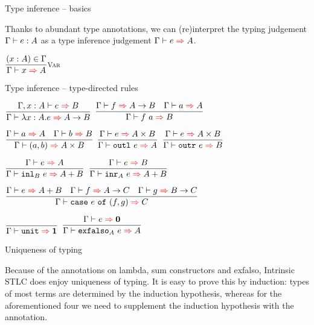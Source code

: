\documentclass{beamer}
\begin{document}
\begin{frame}{Type inference -- basics}

Thanks to abundant type annotations, we can (re)interpret the typing judgement $\Gamma \vdash e : A$ as a type inference judgement $\fullinfer{\Gamma}{e}{A}$.

\vspace{2em}

\begin{center}
  $\infrule[Var]{\sidecond{(x : A) \in \Gamma}}{\infer{x}{A}}$
\end{center}

\end{frame}

\begin{frame}{Type inference -- type-directed rules}

\begin{center}
  $\infrule{\fullinfer{\extend{\Gamma}{x}{A}}{e}{B}}{\infer{\ifun{x}{A}{e}}{\Fun{A}{B}}}$ \quad
  $\infrule{\infer{f}{\Fun{A}{B}} \quad \infer{a}{A}}{\infer{\app{f}{a}}{B}}$

  \vspace{2em}

  $\infrule{\infer{a}{A} \quad \infer{b}{B}}{\infer{\pair{a}{b}}{\Prod{A}{B}}}$ \quad
  $\infrule{\infer{e}{\Prod{A}{B}}}{\infer{\outl{e}}{A}}$ \quad
  $\infrule{\infer{e}{\Prod{A}{B}}}{\infer{\outr{e}}{B}}$

  \vspace{2em}

  $\infrule{\infer{e}{A}}{\infer{\iinl{B}{e}}{\Sum{A}{B}}}$ \quad
  $\infrule{\infer{e}{B}}{\infer{\iinr{A}{e}}{\Sum{A}{B}}}$

  \vspace{2em}

  $\infrule{\infer{e}{\Sum{A}{B}} \quad \infer{f}{\Fun{A}{C}} \quad \infer{g}{\Fun{B}{C}}}{\infer{\case{e}{f}{g}}{C}}$

  \vspace{2em}

  $\infrule{}{\infer{\unit}{\Unit}}$ \quad
  $\infrule{\infer{e}{\Empty}}{\infer{\iexfalso{A}{e}}{A}}$
\end{center}

\end{frame}

\begin{frame}{Uniqueness of typing}

Because of the annotations on lambda, sum constructors and exfalso, Intrinsic STLC does enjoy uniqueness of typing. It is easy to prove this by induction: types of most terms are determined by the induction hypothesis, whereas for the aforementioned four we need to supplement the induction hypothesis with the annotation.

\end{frame}
\end{document}
